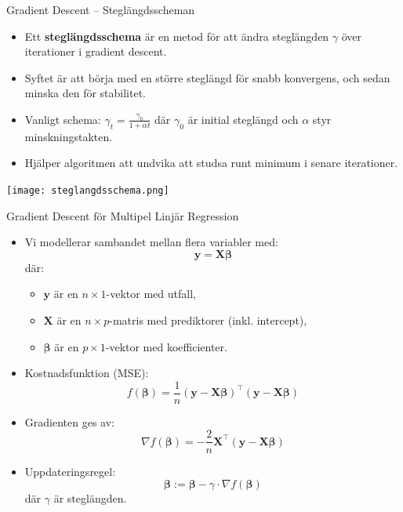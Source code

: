\documentclass[10pt,english]{beamer}
\begin{document}
\begin{frame}{Gradient Descent – Steglängdsscheman}
  \begin{itemize}
    \item Ett \textbf{steglängdsschema} är en metod för att ändra steglängden $\gamma$ över iterationer i gradient descent.
    \item Syftet är att börja med en större steglängd för snabb konvergens, och sedan minska den för stabilitet.
    \item Vanligt schema: $\gamma_t = \frac{\gamma_0}{1 + \alpha t}$ där $\gamma_0$ är initial steglängd och $\alpha$ styr minskningstakten.
    \item Hjälper algoritmen att undvika att studsa runt minimum i senare iterationer.
  \end{itemize}
  \begin{center}
    \texttt{[image: steglangdsschema.png]}
  \end{center}
\end{frame}


\begin{frame}{Gradient Descent för Multipel Linjär Regression}
  \begin{itemize}
    \item Vi modellerar sambandet mellan flera variabler med:
    \[
      \mathbf{y} = \mathbf{X} \boldsymbol{\beta}
    \]
    där:
    \begin{itemize}
      \item $\mathbf{y}$ är en $n \times 1$-vektor med utfall,
      \item $\mathbf{X}$ är en $n \times p$-matris med prediktorer (inkl. intercept),
      \item $\boldsymbol{\beta}$ är en $p \times 1$-vektor med koefficienter.
    \end{itemize}
    \item Kostnadsfunktion (MSE):
    \[
      f(\boldsymbol{\beta}) = \frac{1}{n} (\mathbf{y} - \mathbf{X}\boldsymbol{\beta})^\top (\mathbf{y} - \mathbf{X}\boldsymbol{\beta})
    \]
    \item Gradienten ges av:
    \[
      \nabla f(\boldsymbol{\beta}) = -\frac{2}{n} \mathbf{X}^\top (\mathbf{y} - \mathbf{X}\boldsymbol{\beta})
    \]
    \item Uppdateringsregel:
    \[
      \boldsymbol{\beta} := \boldsymbol{\beta} - \gamma \cdot \nabla f(\boldsymbol{\beta})
    \]
    där $\gamma$ är steglängden.
  \end{itemize}
\end{frame}
\end{document}
